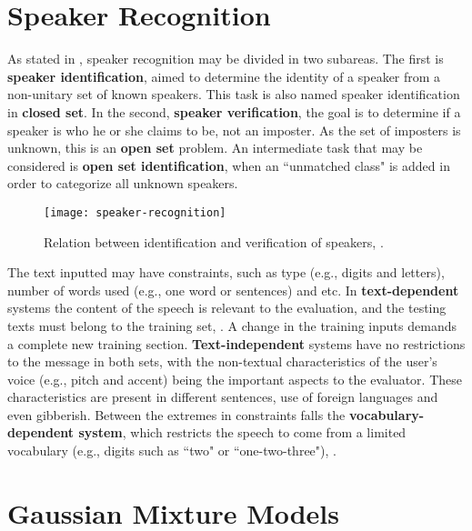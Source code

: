 \section{Speaker Recognition}
\label{sec:speaker-recognition}

As stated in , speaker recognition may be divided in two subareas. The first is \textbf{speaker identification}, aimed to determine the identity of a speaker from a non-unitary set of known speakers. This task is also named speaker identification in \textbf{closed set}. In the second, \textbf{speaker verification}, the goal is to determine if a speaker is who he or she claims to be, not an imposter. As the set of imposters is unknown, this is an \textbf{open set} problem. An intermediate task that may be considered is \textbf{open set identification}, when an ``unmatched class" is added in order to categorize all unknown speakers.

\begin{figure}[ht]
    \centering
    \texttt{[image: speaker-recognition]}
    \caption{Relation between identification and verification of speakers, .}
    \label{fig:speaker-recognition}
\end{figure}

The text inputted may have constraints, such as type (e.g., digits and letters), number of words used (e.g., one word or sentences) and etc. In \textbf{text-dependent} systems the content of the speech is relevant to the evaluation, and the testing texts must belong to the training set, . A change in the training inputs demands a complete new training section. \textbf{Text-independent} systems have no restrictions to the message in both sets, with the non-textual characteristics of the user's voice (e.g., pitch and accent) being the important aspects to the evaluator. These characteristics are present in different sentences, use of foreign languages and even gibberish. Between the extremes in constraints falls the \textbf{vocabulary-dependent system}, which restricts the speech to come from a limited vocabulary (e.g., digits such as ``two" or ``one-two-three"), .

\section{Gaussian Mixture Models}
\label{sec:gmm}

